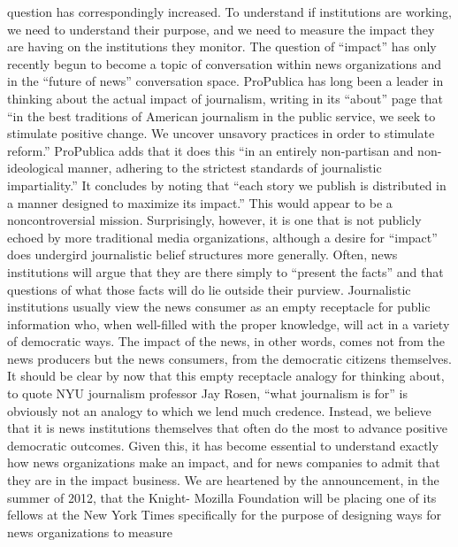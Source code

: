 question has correspondingly increased. To understand if institutions are working,
we need to understand their purpose, and we need to measure the impact they
are having on the institutions they monitor.
The question of ``impact'' has only recently begun to become a topic of conversation
within news organizations and in the ``future of news'' conversation space.
ProPublica has long been a leader in thinking about the actual impact of journalism,
writing in its ``about'' page that ``in the best traditions of American journalism
in the public service, we seek to stimulate positive change. We uncover
unsavory practices in order to stimulate reform.'' ProPublica adds that it does this
``in an entirely non-partisan and non-ideological manner, adhering to the strictest
standards of journalistic impartiality.'' It concludes by noting that ``each story
we publish is distributed in a manner designed to maximize its impact.''
This would appear to be a noncontroversial mission. Surprisingly, however, it is
one that is not publicly echoed by more traditional media organizations, although
a desire for ``impact'' does undergird journalistic belief structures more generally.
Often, news institutions will argue that they are there simply to ``present the
facts'' and that questions of what those facts will do lie outside their purview.
Journalistic institutions usually view the news consumer as an empty receptacle
for public information who, when well-filled with the proper knowledge, will
act in a variety of democratic ways. The impact of the news, in other words,
comes not from the news producers but the news consumers, from the democratic
citizens themselves.
It should be clear by now that this empty receptacle analogy for thinking about,
to quote NYU journalism professor Jay Rosen, ``what journalism is for'' is obviously
not an analogy to which we lend much credence. Instead, we believe that
it is news institutions themselves that often do the most to advance positive
democratic outcomes. Given this, it has become essential to understand exactly
how news organizations make an impact, and for news companies to admit that
they are in the impact business.
We are heartened by the announcement, in the summer of 2012, that the Knight-
Mozilla Foundation will be placing one of its fellows at the New York Times
specifically for the purpose of designing ways for news organizations to measure

